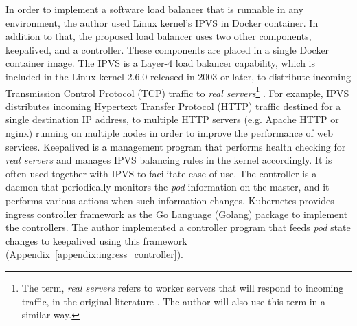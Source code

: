 In order to implement a software load balancer that is runnable in any environment, the author used Linux kernel's IPVS in Docker container.
In addition to that, the proposed load balancer uses two other components, keepalived{, and a }controller.
These components are placed in a single Docker container image.
The IPVS is a Layer-4 load balancer capability, which is included in the Linux kernel 2.6.0 released in 2003 or later,
to distribute incoming Transmission Control Protocol (TCP) traffic to
{\em real servers}\footnote{The term, {\em real servers} refers to worker servers that will respond to incoming traffic,
in the original literature \cite{Zhang2000}. The author will also use this term in a similar way.} \cite{Zhang2000}.
For example, IPVS distributes incoming Hypertext Transfer Protocol (HTTP) traffic destined for a single destination IP address,
to multiple HTTP servers (e.g. Apache HTTP or nginx) running on multiple nodes in order to improve the performance of web services.
Keepalived is a management program that performs health checking for {\em real servers}
and manages IPVS balancing rules in the kernel accordingly.
It is often used together with IPVS to facilitate ease of use.
The controller is a daemon that periodically monitors the {\em pod} information on the master,
and it performs various actions when such information changes.
Kubernetes provides ingress controller framework as the Go Language (Golang) package to implement the controllers.
The author implemented a controller program that feeds {\em pod} state changes to keepalived
using this framework (Appendix~\ref{appendix:ingress_controller}).

